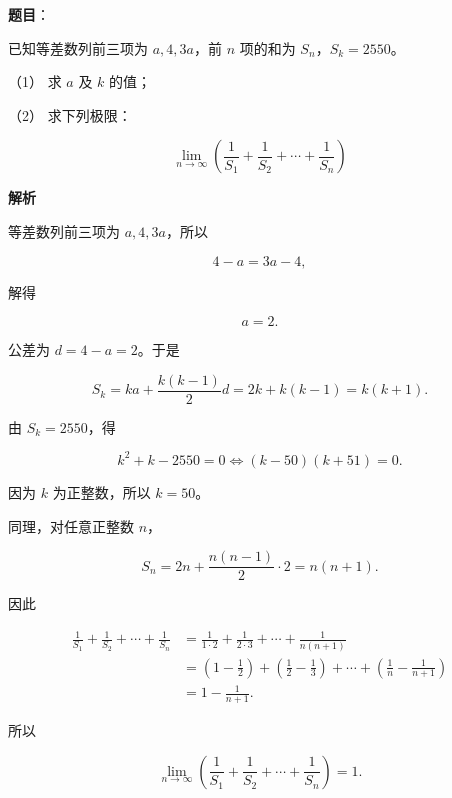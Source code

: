 \begin{answer}

\textbf{题目}：

已知等差数列前三项为 $a,4,3a$，前 $n$ 项的和为 $S_n$，$S_k=2550$。

（1） 求 $a$ 及 $k$ 的值；

（2） 求下列极限：

\nopagebreak[4]
\[
\lim_{n\to\infty}\left(\frac1{S_1}+\frac1{S_2}+\cdots+\frac1{S_n}\right)
\]

\textbf{解析}


等差数列前三项为 $a,4,3a$，所以

\nopagebreak[4]
\[
4-a=3a-4,
\]

解得

\nopagebreak[4]
\[
a=2.
\]

公差为 $d=4-a=2$。于是

\nopagebreak[4]
\[
S_k=ka+\frac{k(k-1)}2d
=2k+k(k-1)=k(k+1).
\]

由 $S_k=2550$，得

\nopagebreak[4]
\[
k^2+k-2550=0
\Longleftrightarrow (k-50)(k+51)=0.
\]

因为 $k$ 为正整数，所以 $k=50$。


同理，对任意正整数 $n$，

\nopagebreak[4]
\[
S_n=2n+\frac{n(n-1)}2\cdot2=n(n+1).
\]

因此

\nopagebreak[4]
\[
\begin{aligned}
\frac1{S_1}+\frac1{S_2}+\cdots+\frac1{S_n}
&=\frac1{1\cdot2}+\frac1{2\cdot3}+\cdots+\frac1{n(n+1)}\\
&=\left(1-\frac12\right)+\left(\frac12-\frac13\right)
+\cdots+\left(\frac1n-\frac1{n+1}\right)\\
&=1-\frac1{n+1}.
\end{aligned}
\]

所以

\nopagebreak[4]
\[
\lim_{n\to\infty}\left(\frac1{S_1}+\frac1{S_2}+\cdots+\frac1{S_n}\right)=1.
\]



\end{answer}
